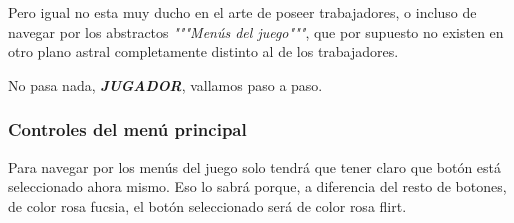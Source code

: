 Pero igual no esta muy ducho en el arte de poseer \textcolor{azulWorker}{trabajadores}, o incluso de navegar por los abstractos \textit{"""Menús del juego"""}, que por supuesto no existen en otro \textcolor{endeavour}{plano astral} completamente distinto al de los \textcolor{azulWorker}{trabajadores}.

No pasa nada, \textit{\textbf{JUGADOR}}, vallamos paso a paso.

\subsubsection{Controles del menú principal}
Para navegar por los menús del juego solo tendrá que tener claro que botón está seleccionado ahora mismo. Eso lo sabrá porque, a diferencia del resto de botones, de color \textcolor{fucsia}{rosa fucsia}, el botón seleccionado será de color \textcolor{flirk}{rosa flirt}.

